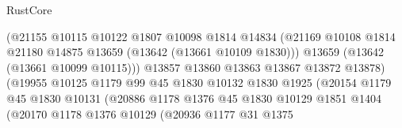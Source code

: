 \begin{lexlean}{RustCore}
\begin{coremodule}
                                        (@21155
                                          @10115
                                          @10122
                                          @1807
                                          @10098
                                          @1814
                                          @14834
                                          (@21169
                                            @10108
                                            @1814
                                            @21180
                                            @14875
                                            @13659
                                            (@13642 (@13661 @10109 @1830)))
                                          @13659
                                          (@13642 (@13661 @10099 @10115)))
                                        @13857
                                        @13860
                                        @13863
                                        @13867
                                        @13872
                                        @13878)
                                      (@19955
                                        @10125
                                        @1179
                                        @99
                                        @45
                                        @1830
                                        @10132
                                        @1830
                                        @1925
                                        (@20154
                                          @1179
                                          @45
                                          @1830
                                          @10131
                                          (@20886
                                            @1178
                                            @1376
                                            @45
                                            @1830
                                            @10129
                                            @1851
                                            @1404
                                            (@20170
                                              @1178
                                              @1376
                                              @10129
                                              (@20936
                                                @1177
                                                @31
                                                @1375

\end{coremodule}
\end{lexlean}
